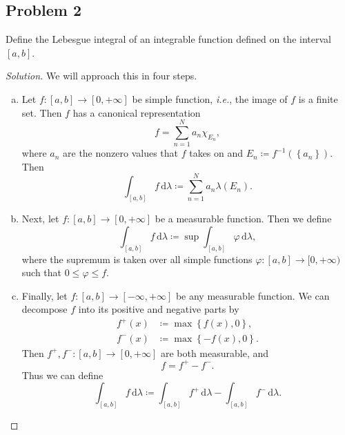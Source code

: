\documentclass[12pt]{article}
\newcommand{\ita}[1]{\textit{#1}}
\newcommand\inv[1]{#1^{-1}}
\newcommand\paren[1]{\left( #1 \right)}
\newcommand\setb[1]{\left \{ #1 \right \}}
\theoremstyle{definition}
\begin{document}
\subsection{Problem 2 \texorpdfstring{\cite{SS}}{}}
Define the Lebesgue integral of an integrable function defined on the interval $[a,b]$.
\begin{proof}[Solution]
    We will approach this in four steps.
    \begin{enumerate}[(a)]
        \item Let $f : [a,b] \to [0,+\infty]$ be simple function, \ita{i.e.}, the image of $f$ is a finite set. Then $f$ has a canonical representation 
        \[
            f = \sum\limits_{n = 1}^N a_n \chi_{E_n} , 
        \]
        where $a_n$ are the nonzero values that $f$ takes on and $E_n \coloneqq \inv{f} \paren{ \setb{ a_n } }$. Then \[
            \int_{[a,b]} f \, \mathrm{d}\lambda \coloneqq \sum\limits_{n = 1}^N a_n \lambda \paren{ E_n }.
        \]
        \item Next, let $f : [a,b] \to [0,+\infty]$ be a measurable function. Then we define
        \[
            \int_{[a,b]} f \, \mathrm{d}\lambda \coloneqq \sup \int_{[a,b]} \varphi \, \mathrm{d}\lambda , 
        \]
        where the supremum is taken over all simple functions $\varphi : [a,b] \to [0,+\infty)$ such that $0 \leq \varphi \leq f$.
        \item Finally, let $f : [a,b] \to [-\infty,+\infty]$ be any measurable function. We can decompose $f$ into its positive and negative parts by 
        \begin{align*}
            f^{+}(x) & \coloneqq \max \setb{ f(x) , 0 } , \\
            f^{-}(x) & \coloneqq \max \setb{ -f(x) , 0 }.
        \end{align*}
        Then $f^{+} , f^{-} : [a,b] \to [0,+\infty]$ are both measurable, and \[
            f = f^{+} - f^{-}.
        \]
        Thus we can define 
        \[
            \int_{[a,b]} f \, \mathrm{d}\lambda \coloneqq \int_{[a,b]} f^{+} \, \mathrm{d}\lambda - \int_{[a,b]} f^{-} \, \mathrm{d}\lambda .
        \]
    \end{enumerate}
\end{proof}
\end{document}
